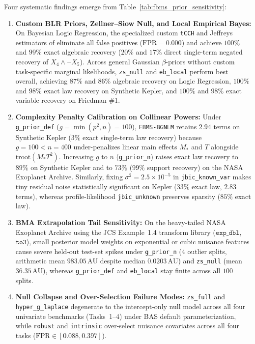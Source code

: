 \documentclass[11pt,a4paper]{article}
\begin{document}
Four systematic findings emerge from Table~\ref{tab:fbms_prior_sensitivity}:
\begin{enumerate}
  \item \textbf{Custom BLR Priors, Zellner--Siow Null, and Local Empirical Bayes:} On Bayesian Logic Regression, the specialized custom \texttt{tCCH} and Jeffreys estimators of \citet{frommlet2025fbms} eliminate all false positives ($\mathrm{FPR} = 0.000$) and achieve $100\%$ and $99\%$ exact algebraic recovery ($20\%$ and $17\%$ direct single-term negated recovery of $X_4 \land \neg X_5$). Across general Gaussian $\beta$-priors without custom task-specific marginal likelihoods, \texttt{zs\_null} and \texttt{eb\_local} perform best overall, achieving $87\%$ and $86\%$ algebraic recovery on Logic Regression, $100\%$ and $98\%$ exact law recovery on Synthetic Kepler, and $100\%$ and $98\%$ exact variable recovery on Friedman \#1.
  \item \textbf{Complexity Penalty Calibration on Collinear Powers:} Under \texttt{g\_prior\_def} ($g = \min(p^2, n) = 100$), \texttt{FBMS-BGNLM} retains $2.94$ terms on Synthetic Kepler ($3\%$ exact single-term law recovery) because $g = 100 < n = 400$ under-penalizes linear main effects $M_*$ and $T$ alongside $\mathrm{troot}(M_* T^2)$. Increasing $g$ to $n$ (\texttt{g\_prior\_n}) raises exact law recovery to $89\%$ on Synthetic Kepler and to $73\%$ ($99\%$ support recovery) on the NASA Exoplanet Archive. Similarly, fixing $\sigma^2 = 2.5\times 10^{-5}$ in \texttt{jbic\_known\_var} makes tiny residual noise statistically significant on Kepler ($33\%$ exact law, $2.83$ terms), whereas profile-likelihood \texttt{jbic\_unknown} preserves sparsity ($85\%$ exact law).
  \item \textbf{BMA Extrapolation Tail Sensitivity:} On the heavy-tailed NASA Exoplanet Archive using the JCS Example~1.4 transform library ($\texttt{exp\_dbl}$, $\texttt{to3}$), small posterior model weights on exponential or cubic nuisance features cause severe held-out test-set spikes under \texttt{g\_prior\_n} ($4$ outlier splits, arithmetic mean $983.05\,\text{AU}$ despite median $0.0203\,\text{AU}$) and \texttt{zs\_null} (mean $36.35\,\text{AU}$), whereas \texttt{g\_prior\_def} and \texttt{eb\_local} stay finite across all $100$ splits.
  \item \textbf{Null Collapse and Over-Selection Failure Modes:} \texttt{zs\_full} and \texttt{hyper\_g\_laplace} degenerate to the intercept-only null model across all four univariate benchmarks (Tasks~1--4) under BAS default parameterization, while \texttt{robust} and \texttt{intrinsic} over-select nuisance covariates across all four tasks ($\mathrm{FPR} \in [0.088, 0.397]$).
\end{enumerate}
\end{document}
